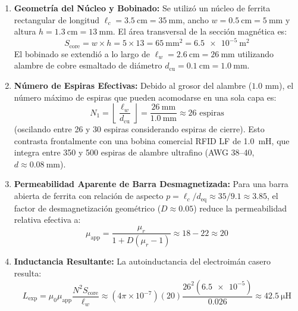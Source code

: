 \begin{enumerate}
    \item \textbf{Geometría del Núcleo y Bobinado:} Se utilizó un núcleo de ferrita rectangular de longitud $\ell_c = \SI{3.5}{\centi\meter} = \SI{35}{\milli\meter}$, ancho $w = \SI{0.5}{\centi\meter} = \SI{5}{\milli\meter}$ y altura $h = \SI{1.3}{\centi\meter} = \SI{13}{\milli\meter}$. El área transversal de la sección magnética es:
    \begin{equation}
        S_{\text{core}} = w \times h = 5 \times 13 = \SI{65}{\milli\meter\squared} = \SI{6.5e-5}{\meter\squared}
    \end{equation}
    El bobinado se extendió a lo largo de $\ell_w = \SI{2.6}{\centi\meter} = \SI{26}{\milli\meter}$ utilizando alambre de cobre esmaltado de diámetro $d_{\text{cu}} = \SI{0.1}{\centi\meter} = \SI{1.0}{\milli\meter}$.
    \item \textbf{Número de Espiras Efectivas:} Debido al grosor del alambre ($1.0\text{ mm}$), el número máximo de espiras que pueden acomodarse en una sola capa es:
    \begin{equation}
        N_1 = \left\lfloor \frac{\ell_w}{d_{\text{cu}}} \right\rfloor = \frac{\SI{26}{\milli\meter}}{\SI{1.0}{\milli\meter}} \approx 26 \text{ espiras}
    \end{equation}
    (oscilando entre 26 y 30 espiras considerando espiras de cierre). Esto contrasta frontalmente con una bobina comercial RFID LF de \SI{1.0}{\milli\henry}, que integra entre 350 y 500 espiras de alambre ultrafino (AWG 38--40, $d \approx \SI{0.08}{\milli\meter}$).
    \item \textbf{Permeabilidad Aparente de Barra Desmagnetizada:} Para una barra abierta de ferrita con relación de aspecto $p = \ell_c / d_{\text{eq}} \approx 35 / 9.1 \approx 3.85$, el factor de desmagnetización geométrico ($D \approx 0.05$) reduce la permeabilidad relativa efectiva a:
    \begin{equation}
        \mu_{\text{app}} = \frac{\mu_r}{1 + D (\mu_r - 1)} \approx 18 - 22 \approx 20
    \end{equation}
    \item \textbf{Inductancia Resultante:} La autoinductancia del electroimán casero resulta:
    \begin{equation}
        L_{\text{exp}} = \mu_0 \mu_{\text{app}} \frac{N^2 S_{\text{core}}}{\ell_w} \approx (4\pi \times 10^{-7}) (20) \frac{26^2 (\num{6.5e-5})}{0.026} \approx \SI{42.5}{\micro\henry}
    \end{equation}

\end{enumerate}
